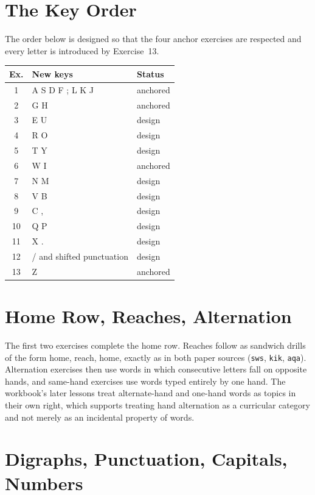 \section{The Key Order}

The order below is designed so that the four anchor exercises are respected and every letter is introduced by Exercise~13.

\begin{center}
\begin{tabular}{@{}cll@{}}
\toprule
Ex. & New keys & Status \\
\midrule
1 & A S D F ; L K J & anchored \\
2 & G H & anchored \\
3 & E U & design \\
4 & R O & design \\
5 & T Y & design \\
6 & W I & anchored \\
7 & N M & design \\
8 & V B & design \\
9 & C , & design \\
10 & Q P & design \\
11 & X . & design \\
12 & / and shifted punctuation & design \\
13 & Z & anchored \\
\bottomrule
\end{tabular}
\end{center}

\section{Home Row, Reaches, Alternation}

The first two exercises complete the home row. Reaches follow as sandwich drills of the form home, reach, home, exactly as in both paper sources (\texttt{sws}, \texttt{kik}, \texttt{aqa}). Alternation exercises then use words in which consecutive letters fall on opposite hands, and same-hand exercises use words typed entirely by one hand. The workbook's later lessons treat alternate-hand and one-hand words as topics in their own right, which supports treating hand alternation as a curricular category and not merely as an incidental property of words.

\section{Digraphs, Punctuation, Capitals, Numbers}

